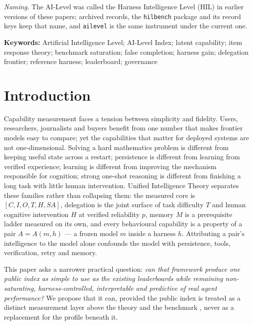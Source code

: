 \documentclass[11pt]{article}
\theoremstyle{definition}
\begin{document}
\noindent\emph{Naming.} The AI-Level was called the Harness Intelligence Level (HIL) in earlier versions of these papers; archived records, the \texttt{hilbench} package and its record keys keep that name, and \texttt{ailevel} is the same instrument under the current one.

\noindent\textbf{Keywords:} Artificial Intelligence Level; AI-Level Index; latent capability; item response theory; benchmark saturation; false completion; harness gain; delegation frontier; reference harness; leaderboard; governance

\tableofcontents
\bigskip

\section{Introduction}\label{sec:intro}

Capability measurement faces a tension between simplicity and fidelity. Users, researchers, journalists and buyers benefit from one number that makes frontier models easy to compare; yet the capabilities that matter for deployed systems are not one-dimensional. Solving a hard mathematics problem is different from keeping useful state across a restart; persistence is different from learning from verified experience; learning is different from improving the mechanism responsible for cognition; strong one-shot reasoning is different from finishing a long task with little human intervention. Unified Intelligence Theory \citep{yang2026unified} separates these families rather than collapsing them: the measured core is $[C, I, O, T, H, SA]$, delegation is the joint surface of task difficulty $T$ and human cognitive intervention $H$ at verified reliability $p$, memory $M$ is a prerequisite ladder measured on its own, and every behavioural capability is a property of a pair $A = A(m, h)$ --- a frozen model $m$ inside a harness $h$. Attributing a pair's intelligence to the model alone confounds the model with persistence, tools, verification, retry and memory.

This paper asks a narrower practical question: \emph{can that framework produce one public index as simple to use as the existing leaderboards while remaining non-saturating, harness-controlled, interpretable and predictive of real agent performance?} We propose that it can, provided the public index is treated as a distinct measurement layer above the theory and the benchmark \citep{yang2026hilbenchpaper}, never as a replacement for the profile beneath it.
\end{document}
